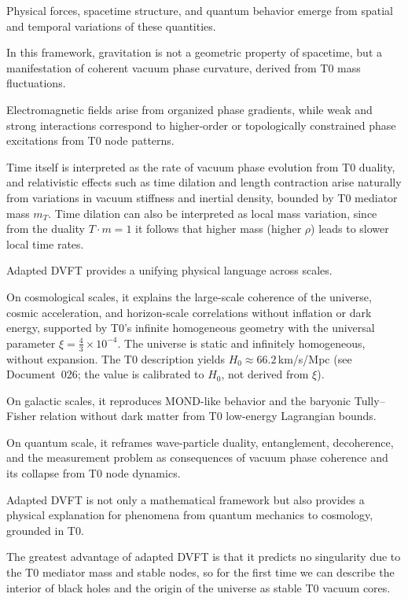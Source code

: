 	Physical forces, spacetime structure, and quantum behavior emerge from spatial and temporal variations of these quantities.
	
	In this framework, gravitation is not a geometric property of spacetime, but a manifestation of coherent vacuum phase curvature, derived from T0 mass fluctuations.
	
	Electromagnetic fields arise from organized phase gradients, while weak and strong interactions correspond to higher-order or topologically constrained phase excitations from T0 node patterns.
	
	Time itself is interpreted as the rate of vacuum phase evolution from T0 duality, and relativistic effects such as time dilation and length contraction arise naturally from variations in vacuum stiffness and inertial density, bounded by T0 mediator mass $m_T$. Time dilation can also be interpreted as local mass variation, since from the duality $T \cdot m = 1$ it follows that higher mass (higher $\rho$) leads to slower local time rates.
	
	Adapted DVFT provides a unifying physical language across scales.
	
	On cosmological scales, it explains the large-scale coherence of the universe, cosmic acceleration, and horizon-scale correlations without inflation or dark energy, supported by T0's infinite homogeneous geometry with the universal parameter $\xi = \frac{4}{3} \times 10^{-4}$. The universe is static and infinitely homogeneous, without expansion. The T0 description yields $H_0 \approx 66.2\,$km/s/Mpc (see Document~026; the value is calibrated to $H_0$, not derived from $\xi$).
	
	On galactic scales, it reproduces MOND-like behavior and the baryonic Tully–Fisher relation without dark matter from T0 low-energy Lagrangian bounds.
	
	On quantum scale, it reframes wave-particle duality, entanglement, decoherence, and the measurement problem as consequences of vacuum phase coherence and its collapse from T0 node dynamics.
	
	Adapted DVFT is not only a mathematical framework but also provides a physical explanation for phenomena from quantum mechanics to cosmology, grounded in T0.
	
	The greatest advantage of adapted DVFT is that it predicts no singularity due to the T0 mediator mass and stable nodes, so for the first time we can describe the interior of black holes and the origin of the universe as stable T0 vacuum cores.
	
